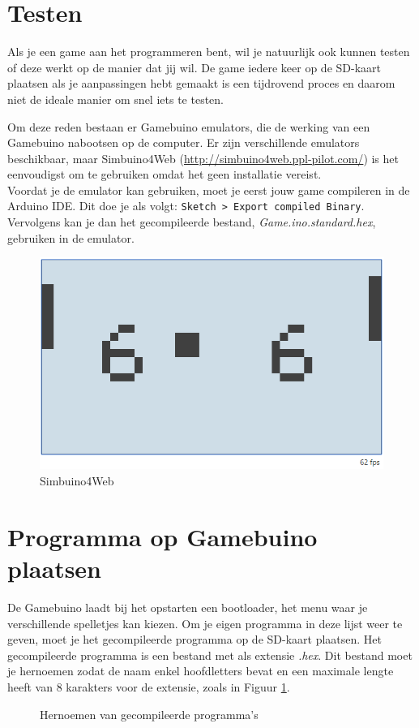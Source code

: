 \documentclass[a4paper,titlepage,12pt]{article}
\begin{document}
	\newpage
	\section{Testen}
	Als je een game aan het programmeren bent, wil je natuurlijk ook kunnen testen of deze werkt op de manier dat jij wil. De game iedere keer op de SD-kaart plaatsen als je aanpassingen hebt gemaakt is een tijdrovend proces en daarom niet de ideale manier om snel iets te testen.
	
	Om deze reden bestaan er Gamebuino emulators\cite{Gamebuino:Wiki:Emulators}, die de werking van een Gamebuino nabootsen op de computer. Er zijn verschillende emulators beschikbaar, maar Simbuino4Web (\url{http://simbuino4web.ppl-pilot.com/}) is het eenvoudigst om te gebruiken omdat het geen installatie vereist. \\
	
	Voordat je de emulator kan gebruiken, moet je eerst jouw game compileren in de Arduino IDE. Dit doe je als volgt: \texttt{Sketch > Export compiled Binary}. Vervolgens kan je dan het gecompileerde bestand, \emph{Game.ino.standard.hex}, gebruiken in de emulator.
	
	\begin{figure}[!b]
		\includegraphics[width=\textwidth]{assets/img/Simbuino4Web.png}
		\caption{Simbuino4Web}
	\end{figure}
	
	
	\newpage
	\section{Programma op Gamebuino plaatsen}
	De Gamebuino laadt bij het opstarten een bootloader, het menu waar je verschillende spelletjes kan kiezen. Om je eigen programma in deze lijst weer te geven, moet je het gecompileerde programma op de SD-kaart plaatsen. Het gecompileerde programma is een bestand met als extensie \emph{.hex}. Dit bestand moet je hernoemen zodat de naam enkel hoofdletters bevat en een maximale lengte heeft van 8 karakters voor de extensie, zoals in Figuur \ref{fig:hernoemen}.
	\begin{figure}[h]
		\centering
		\caption{\label{fig:hernoemen}Hernoemen van gecompileerde programma's}
	\end{figure}
	
\end{document}
